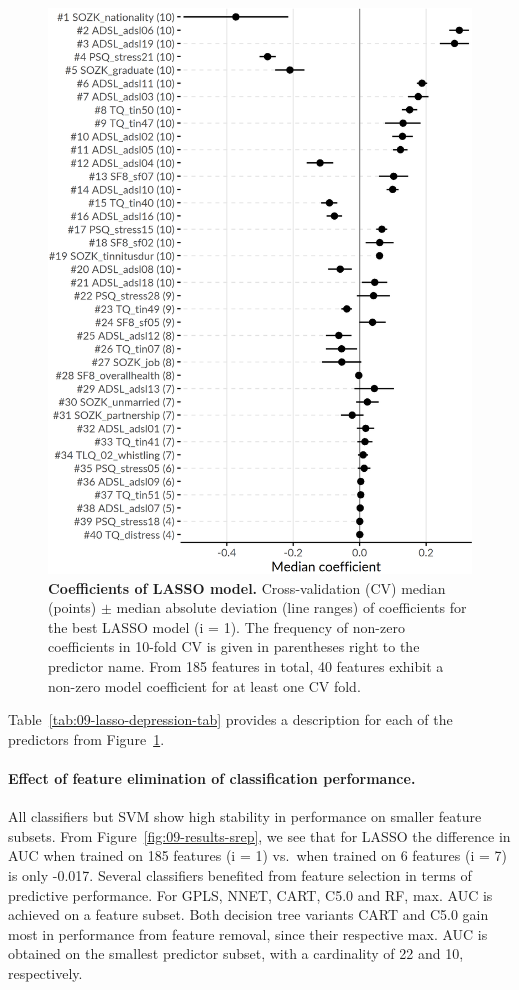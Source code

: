 \documentclass[
  oneside]{book}
\begin{document}
\begin{figure}[htbp]

{\centering \includegraphics[width=0.643\linewidth]{figures/09-lasso-depression} 

}

\caption{\textbf{Coefficients of LASSO model.} Cross-validation (CV) median (points) \(\pm\) median absolute deviation (line ranges) of coefficients for the best LASSO model (i = 1). The frequency of non-zero coefficients in 10-fold CV is given in parentheses right to the predictor name. From 185 features in total, 40 features exhibit a non-zero model coefficient for at least one CV fold.}\label{fig:09-lasso-depression}
\end{figure}

Table~\ref{tab:09-lasso-depression-tab} provides a description for each of the predictors from Figure~\ref{fig:09-lasso-depression}.

\paragraph*{Effect of feature elimination of classification performance.}

All classifiers but SVM show high stability in performance on smaller feature subsets.
From Figure~\ref{fig:09-results-srep}, we see that for LASSO the difference in AUC when trained on 185 features (i = 1) vs.~when trained on 6 features (i = 7) is only -0.017.
Several classifiers benefited from feature selection in terms of predictive performance.
For GPLS, NNET, CART, C5.0 and RF, max. AUC is achieved on a feature subset.
Both decision tree variants CART and C5.0 gain most in performance from feature removal, since their respective max. AUC is obtained on the smallest predictor subset, with a cardinality of 22 and 10, respectively.
\end{document}
